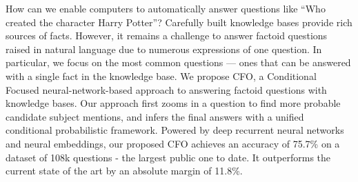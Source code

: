 How can we enable computers to automatically answer questions like ``Who created the character Harry Potter''? Carefully built knowledge bases provide rich sources of facts. However, it remains a challenge to answer factoid questions raised in natural language due to numerous expressions of one question. In particular, we focus on the most common questions — ones that can be answered with a single fact in the knowledge base. We propose CFO, a Conditional Focused neural-network-based approach to answering factoid questions with knowledge bases. Our approach first zooms in a question to find more probable candidate subject mentions, and infers the final answers with a unified conditional probabilistic framework. Powered by deep recurrent neural networks and neural embeddings, our proposed CFO achieves an accuracy of 75.7\% on a dataset of 108k questions - the largest public one to date. It outperforms the current state of the art by an absolute margin of 11.8\%.
